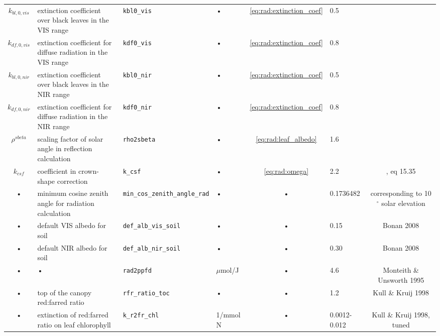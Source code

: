 \begin{table}
\begin{tabularx}{\linewidth}{|c|X|l|l|c|l|c|}
$k_{bl,0,vis}$ & extinction coefficient over black leaves in the VIS range & \texttt{kbl0\_vis} & • & \ref{eq:rad:extinction_coef} & 0.5 & \cite{Spitters:1986tv} \\    
$k_{df,0,vis}$ & extinction coefficient for diffuse radiation in the VIS range & \texttt{kdf0\_vis} & • & \ref{eq:rad:extinction_coef} & 0.8 & \cite{Spitters:1986tv} \\  
$k_{bl,0,nir}$ & extinction coefficient over black leaves in the NIR range & \texttt{kbl0\_nir} & • & \ref{eq:rad:extinction_coef} & 0.5 & \cite{Spitters:1986tv} \\    
$k_{df,0,nir}$ & extinction coefficient for diffuse radiation in the NIR range & \texttt{kdf0\_nir} & • & \ref{eq:rad:extinction_coef} & 0.8 & \cite{Spitters:1986tv} \\  
$\rho^{sbeta}$ & scaling factor of solar angle in reflection calculation& \texttt{rho2sbeta} & • & \ref{eq:rad:leaf_albedo}  & 1.6 & \cite{Spitters:1986tv} \\
$k_{csf}$ & coefficient in crown-shape correction & \texttt{k\_csf} & • & \ref{eq:rad:omega} & 2.2 & \cite{Campbell:1998vb}, eq 15.35 \\  
• & minimum cosine zenith angle for radiation calculation & \texttt{min\_cos\_zenith\_angle\_rad} & • & • & 0.1736482 & corresponding to 10$^{\circ}$ solar elevation \\
• & default VIS albedo for soil & \texttt{def\_alb\_vis\_soil} & • & • & 0.15 & Bonan 2008 \\
• & default NIR albedo for soil & \texttt{def\_alb\_nir\_soil} & • & • & 0.30 & Bonan 2008 \\
• & • & \texttt{rad2ppfd} & $\mu$mol/J & • & 4.6 & Monteith \& Unsworth 1995 \\
• & top of the canopy red:farred ratio & \texttt{rfr\_ratio\_toc} & • & • & 1.2 & Kull \& Kruij 1998 \\
• & extinction of red:farred ratio on leaf chlorophyll & \texttt{k\_r2fr\_chl} & 1/mmol N & • & 0.0012-0.012 & Kull \& Kruij 1998, tuned \\

\hline 
\end{tabularx}
\end{table}


\pagebreak

\newpage

